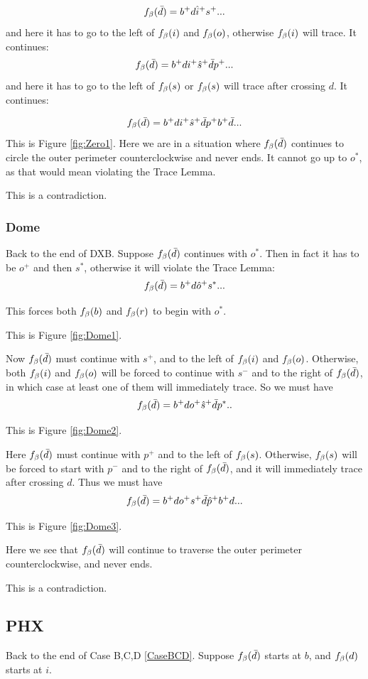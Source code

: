 \[
f_\beta(\bar{d}) = b^+ d \hat{i}^+ s^+...
\]
and here it has to go to the left of $f_\beta(i)$ and $f_\beta(o)$, otherwise $f_\beta(i)$ will trace. It continues:
\[
f_\beta(\bar{d}) = b^+ d i^+ \hat{s}^+ \bar{d} p^+...
\]
and here it has to go to the left of $f_\beta(s)$ or $f_\beta(s)$ will trace after crossing $d$. It continues:

\[
f_\beta(\bar{d}) = b^+ d i^+ \hat{s}^+ \bar{d} p^+ b^+ \bar{d}...
\]
This is Figure \ref{fig:Zero1}. Here we are in a situation where $f_\beta(\bar{d})$ continues to circle the outer perimeter counterclockwise and never ends. It cannot go up to $o^*$, as that would mean violating the Trace Lemma. 

This is a contradiction.

\subsubsection{Dome}\label{Dome}
Back to the end of DXB. Suppose $f_\beta(\bar{d})$ continues with $o^*$. Then in fact it has to be $o^+$ and then $s^*$, otherwise it will violate the Trace Lemma:
\[
f_\beta(\bar{d}) = b^+ d \hat{o}^+ s^*...
\]

This forces both $f_\beta(b)$ and $f_\beta(r)$ to begin with $o^*$.

This is Figure \ref{fig:Dome1}.

Now $f_\beta(\bar{d})$ must continue with $s^+$, and to the left of $f_\beta(i)$ and $f_\beta(o)$. Otherwise, both $f_\beta(i)$ and $f_\beta(o)$ will be forced to continue with $s^-$ and to the right of $f_\beta(\bar{d})$, in which case at least one of them will immediately trace. So we must have
\[
f_\beta(\bar{d}) = b^+ d o^+ \hat{s}^+ \bar{d} p^*..
\]

This is Figure \ref{fig:Dome2}.

Here $f_\beta(\bar{d})$ must continue with $p^+$ and to the left of $f_\beta(s)$. Otherwise, $f_\beta(s)$ will be forced to start with $p^-$ and to the right of $f_\beta(\bar{d})$, and it will immediately trace after crossing $d$. Thus we must have
\[
f_\beta(\bar{d}) = b^+ d o^+ s^+ \bar{d} \hat{p}^+ b^+ d...
\]

This is Figure \ref{fig:Dome3}. 

Here we see that $f_\beta(\bar{d})$ will continue to traverse the outer perimeter counterclockwise, and never ends.

This is a contradiction.

\subsection{PHX} \label{PHX}
Back to the end of Case B,C,D \ref{CaseBCD}. Suppose $f_\beta(\bar{d})$ starts at $b$, and $f_\beta(d)$ starts at $i$.


